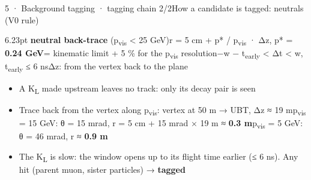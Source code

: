 \begin{btframe}{5 · Background tagging · tagging chain 2/2}{How a candidate is tagged: neutrals (V0 rule)}
\begin{minipage}[c]{0.55\linewidth}
{\par}
\end{minipage}%
\hfill%
\begin{minipage}[c]{0.45\linewidth}
\begin{mathbox}[purple]{6.23pt}
\textbf{neutral back-trace} (p\textsubscript{vis} < 25 GeV)\newline{}r = 5 cm + p* / p\textsubscript{vis} · Δz, p* = \textbf{0.24 GeV}\newline{}\textcolor{muted}{= kinematic limit + 5 \% for the p\textsubscript{vis} resolution}\newline{}−w − t\textsubscript{early} < Δt < w, t\textsubscript{early} ≤ 6 ns\newline{}\textcolor{muted}{Δz: from the vertex back to the plane}
\end{mathbox}
{\fontsize{6.55pt}{7.37pt}\selectfont
\begin{itemize}
  \item A K\textsubscript{L} made upstream leaves no track: only its decay pair is seen
  \item Trace back from the vertex along p\textsubscript{vis}: vertex at 50 m → UBT, Δz ≈ 19 m\newline{}p\textsubscript{vis} = 15 GeV: θ = 15 mrad, r = 5 cm + 15 mrad × 19 m ≈ \textbf{0.3 m}\newline{}p\textsubscript{vis} = 5 GeV: θ = 46 mrad, r ≈ \textbf{0.9 m}
  \item The K\textsubscript{L} is slow: the window opens up to its flight time earlier (≤ 6 ns). Any hit (parent muon, sister particles) → \textbf{tagged}
\end{itemize}}
\end{minipage}\par
\vspace{2.46pt}

\end{btframe}






